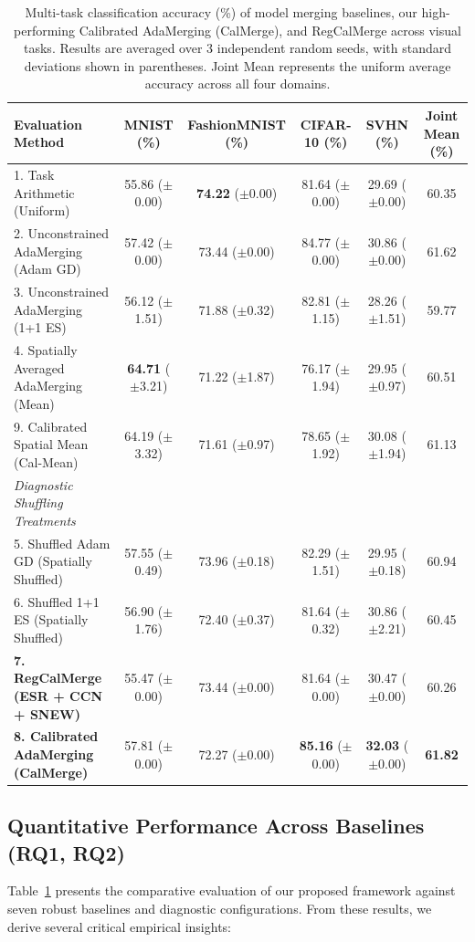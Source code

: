 \begin{table}[t]
\caption{Multi-task classification accuracy (\%) of model merging baselines, our high-performing Calibrated AdaMerging (CalMerge), and RegCalMerge across visual tasks. Results are averaged over 3 independent random seeds, with standard deviations shown in parentheses. Joint Mean represents the uniform average accuracy across all four domains.}
\label{tab:main_results}
\centering
\begin{tabular}{lccccc}
\toprule
\textbf{Evaluation Method} & \textbf{MNIST (\%)} & \textbf{FashionMNIST (\%)} & \textbf{CIFAR-10 (\%)} & \textbf{SVHN (\%)} & \textbf{Joint Mean (\%)} \\
\midrule
1. Task Arithmetic (Uniform) & 55.86 ($\pm$0.00) & \textbf{74.22} ($\pm$0.00) & 81.64 ($\pm$0.00) & 29.69 ($\pm$0.00) & 60.35 \\
2. Unconstrained AdaMerging (Adam GD) & 57.42 ($\pm$0.00) & 73.44 ($\pm$0.00) & 84.77 ($\pm$0.00) & 30.86 ($\pm$0.00) & 61.62 \\
3. Unconstrained AdaMerging (1+1 ES) & 56.12 ($\pm$1.51) & 71.88 ($\pm$0.32) & 82.81 ($\pm$1.15) & 28.26 ($\pm$1.51) & 59.77 \\
4. Spatially Averaged AdaMerging (Mean) & \textbf{64.71} ($\pm$3.21) & 71.22 ($\pm$1.87) & 76.17 ($\pm$1.94) & 29.95 ($\pm$0.97) & 60.51 \\
9. Calibrated Spatial Mean (Cal-Mean) & 64.19 ($\pm$3.32) & 71.61 ($\pm$0.97) & 78.65 ($\pm$1.92) & 30.08 ($\pm$1.94) & 61.13 \\
\midrule
\emph{Diagnostic Shuffling Treatments} & & & & & \\
5. Shuffled Adam GD (Spatially Shuffled) & 57.55 ($\pm$0.49) & 73.96 ($\pm$0.18) & 82.29 ($\pm$1.51) & 29.95 ($\pm$0.18) & 60.94 \\
6. Shuffled 1+1 ES (Spatially Shuffled) & 56.90 ($\pm$1.76) & 72.40 ($\pm$0.37) & 81.64 ($\pm$0.32) & 30.86 ($\pm$2.21) & 60.45 \\
\midrule
\textbf{7. RegCalMerge (ESR + CCN + SNEW)} & 55.47 ($\pm$0.00) & 73.44 ($\pm$0.00) & 81.64 ($\pm$0.00) & 30.47 ($\pm$0.00) & 60.26 \\
\textbf{8. Calibrated AdaMerging (CalMerge)} & 57.81 ($\pm$0.00) & 72.27 ($\pm$0.00) & \textbf{85.16} ($\pm$0.00) & \textbf{32.03} ($\pm$0.00) & \textbf{61.82} \\
\bottomrule
\end{tabular}
\end{table}

\subsection{Quantitative Performance Across Baselines (RQ1, RQ2)}
Table~\ref{tab:main_results} presents the comparative evaluation of our proposed framework against seven robust baselines and diagnostic configurations. From these results, we derive several critical empirical insights:

